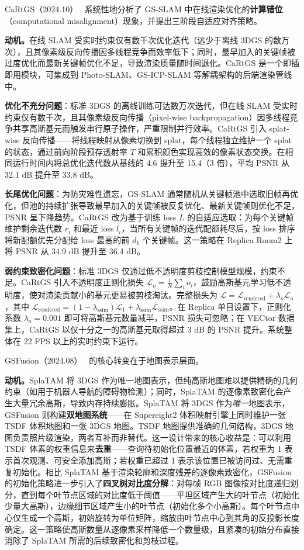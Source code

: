 CaRtGS（2024.10）~\cite{2410_00486} 系统性地分析了 GS-SLAM 中在线渲染优化的\textbf{计算错位}（computational misalignment）现象，并提出三阶段自适应对齐策略。

\textbf{动机。}在线 SLAM 受实时约束仅有数千次优化迭代（远少于离线 3DGS 的数万次），且其像素级反向传播因多线程竞争而效率低下；同时，最早加入的关键帧被过度优化而最新关键帧优化不足，导致渲染质量随时间退化。CaRtGS 是一个即插即用模块，可集成到 Photo-SLAM、GS-ICP-SLAM 等解耦架构的后端渲染管线中。

\textbf{优化不充分问题}：标准 3DGS 的离线训练可达数万次迭代，但在线 SLAM 受实时约束仅有数千次，且其像素级反向传播（pixel-wise backpropagation）因多线程竞争共享高斯基元而触发串行原子操作，严重限制并行效率。CaRtGS 引入 splat-wise 反向传播——将线程映射从像素切换到 splat，每个线程独立维护一个 splat 的状态，通过前向阶段预存透射率 $T$ 和累积颜色实现高效的像素状态交换。在相同运行时间内将总优化迭代数从基线的 4.6 提升至 15.4（3 倍），平均 PSNR 从 32.1 dB 提升至 33.8 dB。

\textbf{长尾优化问题}：为防灾难性遗忘，GS-SLAM 通常随机从关键帧池中选取旧帧再优化，但池的持续扩张导致最早加入的关键帧被反复优化、最新关键帧则优化不足，PSNR 呈下降趋势。CaRtGS 改为基于训练 loss $L$ 的自适应选取：为每个关键帧维护剩余迭代数 $r_i$ 和最近 loss $l_i$，当所有关键帧的迭代配额耗尽后，按 loss 排序将新配额优先分配给 loss 最高的前 $d_k$ 个关键帧。这一策略在 Replica Room2 上将 PSNR 从 34.9 dB 提升至 36.4 dB。

\textbf{弱约束致密化问题}：标准 3DGS 仅通过低不透明度剪枝控制模型规模，约束不足。CaRtGS 引入不透明度正则化损失 $\mathcal{L}_o = \frac{1}{N}\sum_i o_i$，鼓励高斯基元学习低不透明度，使对渲染贡献小的基元更易被剪枝淘汰。完整损失为 $\mathcal{L} = \mathcal{L}_\text{rendered} + \lambda_o \mathcal{L}_o$，其中 $\mathcal{L}_\text{rendered} = (1-\lambda_\text{ssim})\mathcal{L}_1 + \lambda_\text{ssim}\mathcal{L}_\text{ssim}$。在 Replica 单目设置下，正则化系数 $\lambda_o=0.001$ 即可将高斯基元数量减半，PSNR 损失可忽略；在 VECtor 数据集上，CaRtGS 以仅十分之一的高斯基元取得超过 3 dB 的 PSNR 提升。系统整体在 22 FPS 以上的实时约束下运行。

GSFusion（2024.08）~\cite{2408_12677} 的核心转变在于地图表示层面。

\textbf{动机。}SplaTAM 将 3DGS 作为唯一地图表示，但纯高斯地图难以提供精确的几何约束（如用于机器人导航的障碍物检测）；同时，SplaTAM 的逐像素致密化会产生大量冗余高斯，导致内存持续膨胀。SplaTAM 将 3DGS 作为\emph{唯一}地图表示，GSFusion 则构建\textbf{双地图系统}——在 Supereight2 体积映射引擎上同时维护一张 TSDF 体积地图和一张 3DGS 地图。TSDF 地图提供准确的几何结构，3DGS 地图负责照片级渲染，两者互补而非替代。这一设计带来的核心收益是：可以利用 TSDF 体素的权重信息来\textbf{去重}——查询待初始化位置最近的体素，若权重为 1 表示首次观测、可安全添加高斯；若权重已超过 1 表示该位置已被访问过、无需重复初始化。相比 SplaTAM 基于渲染轮廓和深度残差的逐像素致密化，GSFusion 的初始化策略进一步引入了\textbf{四叉树对比度分解}：对每帧 RGB 图像按对比度递归划分，直到每个叶节点区域的对比度低于阈值——平坦区域产生大的叶节点（初始化少量大高斯），边缘细节区域产生小的叶节点（初始化多个小高斯）。每个叶节点中心仅生成一个高斯，初始旋转为单位矩阵，缩放由叶节点中心到其角的反投影长度确定。这一策略使高斯数量从逐像素采样降低一个数量级，且紧凑的初始分布直接消除了 SplaTAM 所需的后续致密化和剪枝过程。

